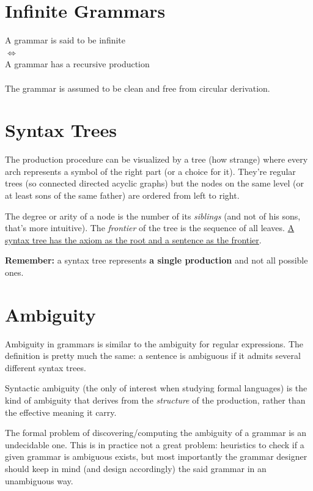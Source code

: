     \section{Infinite Grammars}
        A grammar is said to be infinite\\
        $\Leftrightarrow$\\
        A grammar has a recursive production\\\\
        The grammar is assumed to be clean and free from circular derivation. 
       
    \section{Syntax Trees}
    	The production procedure can be visualized by a tree (how strange) where every arch represents a symbol of the right part (or a choice for it). They're 
		regular trees (so connected directed acyclic graphs) but the nodes on the same level (or at least sons of the same father) are ordered from left to right.

    	The degree or arity of a node is the number of its \emph{siblings} (and not of his sons, that's more intuitive). The \emph{frontier} of the tree is the 
		sequence of all leaves. \underline{A syntax tree has the axiom as the root and a sentence as the frontier}.

    	\textbf{Remember:} a syntax tree represents \textbf{a single production} and not all possible ones.
	
	\section{Ambiguity}\label{sec:ambig}
		Ambiguity in grammars is similar to the ambiguity for regular expressions. The definition is pretty much the same: a sentence is ambiguous 
		if it admits several different syntax trees.

		Syntactic ambiguity (the only of interest when studying formal languages) is the kind of ambiguity that derives from the \emph{structure} of the production, 
		rather than the effective meaning it carry.%

		The formal problem of discovering/computing the ambiguity of a grammar is an undecidable one. This is in practice not a great problem: heuristics to check 
		if a given grammar is ambiguous exists, but most importantly the grammar designer should keep in mind (and design accordingly) the said grammar in an 
		unambiguous way.
		

